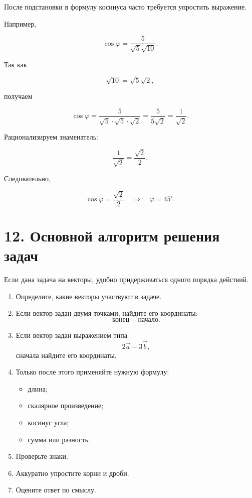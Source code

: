 \documentclass[a4paper,12pt]{article}
\begin{document}
После подстановки в формулу косинуса часто требуется упростить выражение.

Например,

\[
\cos\varphi
=
\frac{5}{\sqrt5\sqrt{10}}.
\]

Так как

\[
\sqrt{10}=\sqrt5\sqrt2,
\]

получаем

\[
\cos\varphi
=
\frac{5}{\sqrt5\cdot\sqrt5\cdot\sqrt2}
=
\frac{5}{5\sqrt2}
=
\frac{1}{\sqrt2}.
\]

Рационализируем знаменатель:

\[
\frac{1}{\sqrt2}
=
\frac{\sqrt2}{2}.
\]

Следовательно,

\[
\cos\varphi=\frac{\sqrt2}{2}
\quad\Longrightarrow\quad
\boxed{\varphi=45^\circ}.
\]


\section*{\color{darkaccent}12. Основной алгоритм решения задач}

Если дана задача на векторы, удобно придерживаться одного порядка действий.

\begin{enumerate}
    \item Определите, какие векторы участвуют в задаче.
    \item Если вектор задан двумя точками, найдите его координаты:
    \[
    \text{конец}-\text{начало}.
    \]
    \item Если вектор задан выражением типа
    \[
    2\vec a-3\vec b,
    \]
    сначала найдите его координаты.
    \item Только после этого применяйте нужную формулу:
    \begin{itemize}
        \item длина;
        \item скалярное произведение;
        \item косинус угла;
        \item сумма или разность.
    \end{itemize}
    \item Проверьте знаки.
    \item Аккуратно упростите корни и дроби.
    \item Оцените ответ по смыслу.
\end{enumerate}
\end{document}
